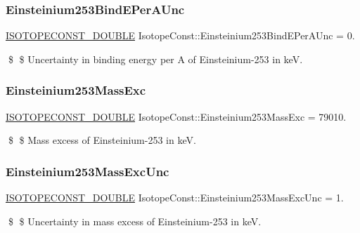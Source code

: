 \subsubsection{\texorpdfstring{Einsteinium253\+Bind\+E\+Per\+A\+Unc}{Einsteinium253BindEPerAUnc}}
{\footnotesize\ttfamily \mbox{\hyperlink{group___isotope_const-_macros_ga8f45a7272ce02c0b4c65c44636ed719a}{I\+S\+O\+T\+O\+P\+E\+C\+O\+N\+S\+T\+\_\+\+D\+O\+U\+B\+LE}} Isotope\+Const\+::\+Einsteinium253\+Bind\+E\+Per\+A\+Unc = 0.}

\$ \$ Uncertainty in binding energy per A of Einsteinium-\/253 in keV. \mbox{\label{group___isotope_const-_einsteinium-_es253_ga4164925df84fd8d70b261dd6a91cbf53}} 
\subsubsection{\texorpdfstring{Einsteinium253\+Mass\+Exc}{Einsteinium253MassExc}}
{\footnotesize\ttfamily \mbox{\hyperlink{group___isotope_const-_macros_ga8f45a7272ce02c0b4c65c44636ed719a}{I\+S\+O\+T\+O\+P\+E\+C\+O\+N\+S\+T\+\_\+\+D\+O\+U\+B\+LE}} Isotope\+Const\+::\+Einsteinium253\+Mass\+Exc = 79010.}

\$ \$ Mass excess of Einsteinium-\/253 in keV. \mbox{\label{group___isotope_const-_einsteinium-_es253_ga7b1b18419731a43affb1e9a229975216}} 
\subsubsection{\texorpdfstring{Einsteinium253\+Mass\+Exc\+Unc}{Einsteinium253MassExcUnc}}
{\footnotesize\ttfamily \mbox{\hyperlink{group___isotope_const-_macros_ga8f45a7272ce02c0b4c65c44636ed719a}{I\+S\+O\+T\+O\+P\+E\+C\+O\+N\+S\+T\+\_\+\+D\+O\+U\+B\+LE}} Isotope\+Const\+::\+Einsteinium253\+Mass\+Exc\+Unc = 1.}

\$ \$ Uncertainty in mass excess of Einsteinium-\/253 in keV. \mbox{\label{group___isotope_const-_einsteinium-_es253_ga05a315db43603a530539442b884837fe}} 
